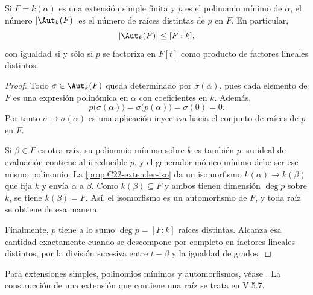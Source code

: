 \begin{coro}\label{coro:C22-automorfismos}
Si $F=k(\alpha)$ es una extensión simple finita y $p$ es el polinomio mínimo de $\alpha$, el número $|\Aut_k(F)|$ es el número de raíces distintas de $p$ en $F$. En particular,
\[
|\Aut_k(F)|\leq[F:k],
\]
con igualdad si y sólo si $p$ se factoriza en $F[t]$ como producto de factores lineales distintos.
\end{coro}
\begin{proof}
Todo $\sigma\in\Aut_k(F)$ queda determinado por $\sigma(\alpha)$, pues cada elemento de $F$ es una expresión polinómica en $\alpha$ con coeficientes en $k$. Además,
\[
p\bigl(\sigma(\alpha)\bigr)=\sigma\bigl(p(\alpha)\bigr)=\sigma(0)=0.
\]
Por tanto $\sigma\mapsto\sigma(\alpha)$ es una aplicación inyectiva hacia el conjunto de raíces de $p$ en $F$.

Si $\beta\in F$ es otra raíz, su polinomio mínimo sobre $k$ es también $p$: su ideal de evaluación contiene al irreducible $p$, y el generador mónico mínimo debe ser ese mismo polinomio. La \cref{prop:C22-extender-iso} da un isomorfismo $k(\alpha)\to k(\beta)$ que fija $k$ y envía $\alpha$ a $\beta$. Como $k(\beta)\subseteq F$ y ambos tienen dimensión $\deg p$ sobre $k$, se tiene $k(\beta)=F$. Así, el isomorfismo es un automorfismo de $F$, y toda raíz se obtiene de esa manera.

Finalmente, $p$ tiene a lo sumo $\deg p=[F:k]$ raíces distintas. Alcanza esa cantidad exactamente cuando se descompone por completo en factores lineales distintos, por la división sucesiva entre $t-\beta$ y la igualdad de grados.
\end{proof}

\begin{obs}
Para extensiones simples, polinomios mínimos y automorfismos, véase \citet[cap.~VII, apartados 1.1--2, definiciones 1.1--2, proposiciones 1.3/5, ejemplo 1.4 y corolario 1.7]{aluffi2009}. La construcción de una extensión que contiene una raíz se trata en V.5.7.
\end{obs}

